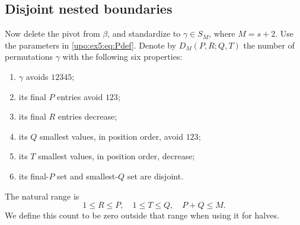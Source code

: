 \documentclass[11pt,letterpaper]{article}
\theoremstyle{remark}\newtheorem{remark}[theorem]{Remark}
\numberwithin{equation}{section}
\begin{document}
\subsection{Disjoint nested boundaries}
Now delete the pivot from $\beta$, and standardize to
$\gamma\in S_M$, where $M=s+2$. Use the parameters in
\eqref{upo:ex5:eq:Pdef}. Denote by $D_M(P,R;Q,T)$ the number of permutations
$\gamma$ with the following six properties:
\begin{enumerate}
\item $\gamma$ avoids $12345$;
\item its final $P$ entries avoid $123$;
\item its final $R$ entries decrease;
\item its $Q$ smallest values, in position order, avoid $123$;
\item its $T$ smallest values, in position order, decrease;
\item its final-$P$ set and smallest-$Q$ set are disjoint.
\end{enumerate}
The natural range is
\begin{equation}\label{upo:ex5:eq:Drange}
 1\le R\le P,\quad 1\le T\le Q,\quad P+Q\le M.
\end{equation}
We define this count to be zero outside that range when using it for
halves.
\end{document}
